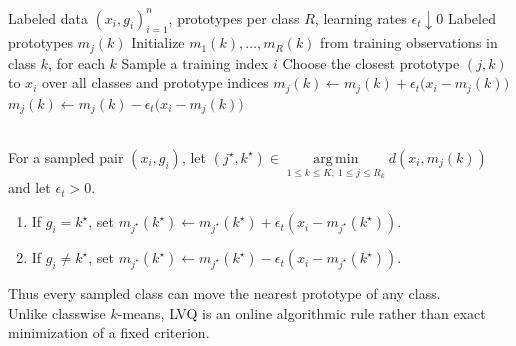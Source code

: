 \begin{breakablealgorithm}
\caption{Learning Vector Quantization}
\label{alg:sl-learning-vector-quantization}
\begin{algorithmic}
\Require Labeled data $(x_i,g_i)_{i=1}^n$, prototypes per class $R$, learning rates $\epsilon_t\downarrow0$
\Ensure Labeled prototypes $m_j(k)$
\State Initialize $m_1(k),\ldots,m_R(k)$ from training observations in class $k$, for each $k$
\State Sample a training index $i$
\State Choose the closest prototype $(j,k)$ to $x_i$ over all classes and prototype indices
\State $m_j(k)\gets m_j(k)+\epsilon_t\bigl(x_i-m_j(k)\bigr)$
\Else
\State $m_j(k)\gets m_j(k)-\epsilon_t\bigl(x_i-m_j(k)\bigr)$
\EndIf
\EndFor
\end{algorithmic}
\end{breakablealgorithm}

\begin{remark} \label{rem:sl-lvq-geometry} \\
For a sampled pair $(x_i,g_i)$, let $(j^\star,k^\star)\in\operatorname*{arg\,min}\limits_{1\leq k\leq K,\ 1\leq j\leq R_k}d(x_i,m_j(k))$ and let $\epsilon_t>0$.
\begin{enumerate}[label=(\roman*)]
\setlength{\itemsep}{0pt}
\item If $g_i=k^\star$, set $m_{j^\star}(k^\star)\gets m_{j^\star}(k^\star)+\epsilon_t(x_i-m_{j^\star}(k^\star))$.
\item If $g_i\neq k^\star$, set $m_{j^\star}(k^\star)\gets m_{j^\star}(k^\star)-\epsilon_t(x_i-m_{j^\star}(k^\star))$.
\end{enumerate}
Thus every sampled class can move the nearest prototype of any class.\\
Unlike classwise $k$-means, LVQ is an online algorithmic rule rather than exact minimization of a fixed criterion.
\end{remark}

